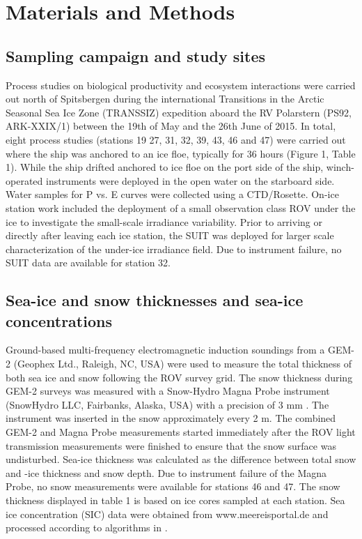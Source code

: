 \section{Materials and Methods}

\subsection{Sampling campaign and study sites}

Process studies on biological productivity and ecosystem interactions were carried out north of Spitsbergen during the international Transitions in the Arctic Seasonal Sea Ice Zone (TRANSSIZ) expedition aboard the RV Polarstern (PS92, ARK-XXIX/1) between the 19th of May and the 26th June of 2015. In total, eight process studies (stations 19 27, 31, 32, 39, 43, 46 and 47) were carried out where the ship was anchored to an ice floe, typically for 36 hours (Figure 1, Table 1). While the ship drifted anchored to ice floe on the port side of the ship, winch-operated instruments were deployed in the open water on the starboard side. Water samples for P vs. E curves were collected using a CTD/Rosette. On-ice station work included the deployment of a small observation class ROV under the ice to investigate the small-scale irradiance variability. Prior to arriving or directly after leaving each ice station, the SUIT was deployed for larger scale characterization of the under-ice irradiance field. Due to instrument failure, no SUIT data are available for station 32.

\subsection{Sea-ice and snow thicknesses and sea-ice concentrations}

Ground-based multi-frequency electromagnetic induction soundings from a GEM-2 (Geophex Ltd., Raleigh, NC, USA) were used to measure the total thickness of both sea ice and snow following the ROV survey grid. The snow thickness during GEM-2 surveys was measured with a Snow-Hydro Magna Probe instrument (SnowHydro LLC, Fairbanks, Alaska, USA) with a precision of 3 mm \citep{Sturm2006}. The instrument was inserted in the snow approximately every 2 m. The combined GEM-2 and Magna Probe measurements started immediately after the ROV light transmission measurements were finished to ensure that the snow surface was undisturbed. Sea-ice thickness was calculated as the difference between total snow and -ice thickness and snow depth. Due to instrument failure of the Magna Probe, no snow measurements were available for stations 46 and 47. The snow thickness displayed in table 1 is based on ice cores sampled at each station. Sea ice concentration (SIC) data were obtained from www.meereisportal.de and processed according to algorithms in \citet{Spreen2008}.

